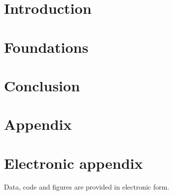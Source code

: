 \documentclass[12pt]{article}
\begin{document}
\newpage
\tableofcontents

\newpage


    
\section{Introduction}
\label{intro}

\newpage

\section{Foundations}
\label{foundations}

\newpage

\section{Conclusion}
\label{conclusion}


\newpage

    

\setcounter{page}{5} %

\appendix

\section{Appendix}
\label{app}

\newpage

\section{Electronic appendix}
\label{el_app}

Data, code and figures are provided in electronic form.

\newpage
    
\end{document}
